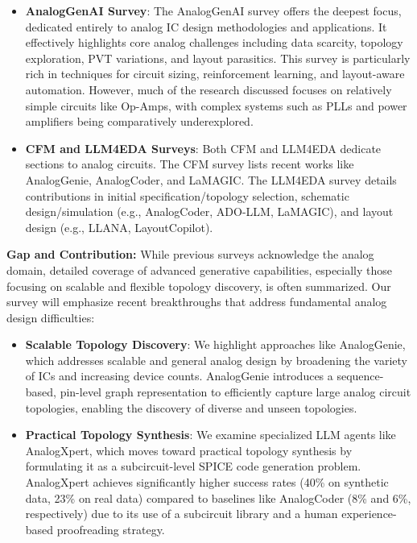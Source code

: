 \documentclass{ieeeaccess}
\begin{document}
\begin{itemize}
	\item \textbf{AnalogGenAI Survey}: The AnalogGenAI survey offers the deepest focus, dedicated entirely to analog IC design methodologies and applications. It effectively highlights core analog challenges including data scarcity, topology exploration, PVT variations, and layout parasitics. This survey is particularly rich in techniques for circuit sizing, reinforcement learning, and layout-aware automation. However, much of the research discussed focuses on relatively simple circuits like Op-Amps, with complex systems such as PLLs and power amplifiers being comparatively underexplored.
	\item \textbf{CFM and LLM4EDA Surveys}: Both CFM and LLM4EDA dedicate sections to analog circuits. The CFM survey lists recent works like AnalogGenie, AnalogCoder, and LaMAGIC. The LLM4EDA survey details contributions in initial specification/topology selection, schematic design/simulation (e.g., AnalogCoder, ADO-LLM, LaMAGIC), and layout design (e.g., LLANA, LayoutCopilot).
\end{itemize}

\textbf{Gap and Contribution:} While previous surveys acknowledge the analog domain, detailed coverage of advanced generative capabilities, especially those focusing on scalable and flexible topology discovery, is often summarized. Our survey will emphasize recent breakthroughs that address fundamental analog design difficulties:
\begin{itemize}
	\item \textbf{Scalable Topology Discovery}: We highlight approaches like AnalogGenie, which addresses scalable and general analog design by broadening the variety of ICs and increasing device counts. AnalogGenie introduces a sequence-based, pin-level graph representation to efficiently capture large analog circuit topologies, enabling the discovery of diverse and unseen topologies.
	\item \textbf{Practical Topology Synthesis}: We examine specialized LLM agents like AnalogXpert, which moves toward practical topology synthesis by formulating it as a subcircuit-level SPICE code generation problem. AnalogXpert achieves significantly higher success rates (40\% on synthetic data, 23\% on real data) compared to baselines like AnalogCoder (8\% and 6\%, respectively) due to its use of a subcircuit library and a human experience-based proofreading strategy.
\end{itemize}
\end{document}
